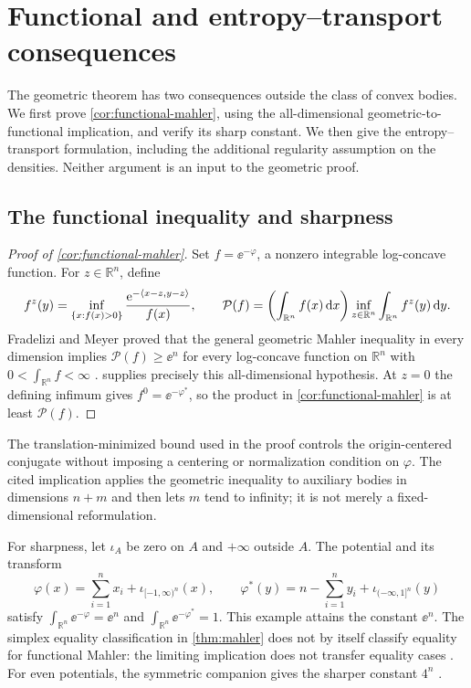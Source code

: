 \section{Functional and entropy--transport consequences}\label{sec:consequences}

The geometric theorem has two consequences outside the class of convex bodies. We first prove \cref{cor:functional-mahler}, using the all-dimensional geometric-to-functional implication, and verify its sharp constant. We then give the entropy--transport formulation, including the additional regularity assumption on the densities. Neither argument is an input to the geometric proof.

\subsection{The functional inequality and sharpness}

\begin{proof}[Proof of \cref{cor:functional-mahler}]
Set $f=\ee^{-\varphi}$, a nonzero integrable log-concave function. For $z\in\mathbb{R}^n$, define
\[
 f^z(y)=\inf_{\{x:f(x)>0\}}
        \frac{\mathrm{e}^{-\langle x-z,y-z\rangle}}{f(x)},
 \qquad
 \mathcal{P}(f)=
 \left(\int_{\mathbb{R}^n}f(x)\,\mathrm{d} x\right)
 \inf_{z\in\mathbb{R}^n}\int_{\mathbb{R}^n}f^z(y)\,\mathrm{d} y.
\]
Fradelizi and Meyer proved that the general geometric Mahler inequality in every dimension implies $\mathcal{P}(f)\ge \ee^n$ for every log-concave function on $\mathbb{R}^n$ with $0<\int_{\mathbb{R}^n}f<\infty$ \cite[Proposition~2(a)]{FradeliziMeyer2008}.  supplies precisely this all-dimensional hypothesis. At $z=0$ the defining infimum gives $f^0=\ee^{-\varphi^*}$, so the product in \cref{cor:functional-mahler} is at least $\mathcal{P}(f)$.
\end{proof}

The translation-minimized bound used in the proof controls the origin-centered conjugate without imposing a centering or normalization condition on $\varphi$. The cited implication applies the geometric inequality to auxiliary bodies in dimensions $n+m$ and then lets $m$ tend to infinity; it is not merely a fixed-dimensional reformulation.

For sharpness, let $\iota_A$ be zero on $A$ and $+\infty$ outside $A$. The potential and its transform
\[
 \varphi(x)=\sum_{i=1}^n x_i+\iota_{[-1,\infty)^n}(x),
 \qquad
 \varphi^*(y)=n-\sum_{i=1}^n y_i+\iota_{(-\infty,1]^n}(y)
\]
satisfy $\int_{\mathbb{R}^n}\ee^{-\varphi}=\ee^n$ and $\int_{\mathbb{R}^n}\ee^{-\varphi^*}=1$. This example attains the constant $\ee^n$. The simplex equality classification in \cref{thm:mahler} does not by itself classify equality for functional Mahler: the limiting implication does not transfer equality cases \cite[p.~1437]{FradeliziMeyer2008}. For even potentials, the symmetric companion gives the sharper constant $4^n$ \cite[Corollary~1.2]{OpenAISymmetricMahler2026}.

